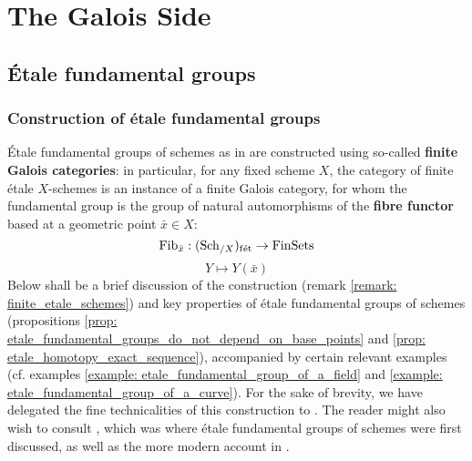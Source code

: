\section{The Galois Side}
    \subsection{\'Etale fundamental groups}
        \subsubsection{Construction of \'etale fundamental groups}
            \'Etale fundamental groups of schemes as in \cite[Expos\'e V]{SGA1} are constructed using so-called \textbf{finite Galois categories}: in particular, for any fixed scheme $X$, the category of finite \'etale $X$-schemes is an instance of a finite Galois category, for whom the fundamental group is the group of natural automorphisms of the \textbf{fibre functor} based at a geometric point $\bar{x} \in X$:
                $$\mathrm{Fib}_{\bar{x}}: (\mathrm{Sch}_{/X})_{\mathrm{f\acute{e}t}} \to \mathrm{Fin}\mathrm{Sets}$$
                $$Y \mapsto Y(\bar{x})$$
            Below shall be a brief discussion of the construction (remark \ref{remark: finite_etale_schemes}) and key properties of \'etale fundamental groups of schemes (propositions \ref{prop: etale_fundamental_groups_do_not_depend_on_base_points} and \ref{prop: etale_homotopy_exact_sequence}), accompanied by certain relevant examples (cf. examples \ref{example: etale_fundamental_group_of_a_field} and \ref{example: etale_fundamental_group_of_a_curve}). For the sake of brevity, we have delegated the fine technicalities of this construction to \cite{MATH525_covering_spaces_and_fundamental_group_project}. The reader might also wish to consult \cite[Expos\'e V]{SGA1}, which was where \'etale fundamental groups of schemes were first discussed, as well as the more modern account in \cite[\href{https://stacks.math.columbia.edu/tag/0BQ6}{Tag 0BQ6}]{stacks}.
            
